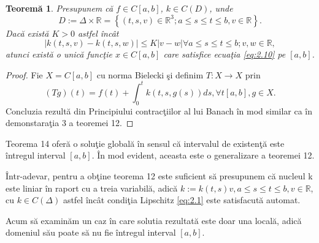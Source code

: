 \documentclass[a4paper,12pt,oneside]{report}
\newtheorem{theorem}{Teorem\u a}
\begin{document}
\begin{theorem}
Presupunem c\u{a} \(f\in C\left [ a,b \right ]\), \(k\in C\left ( D \right )\), unde
\begin{displaymath}
D:= \Delta \times \mathbb{R} = \left \{ \left ( t,s,v \right )\in \mathbb{R}^{3}; a\leq s\leq t\leq b, v\in \mathbb{R}\right \}.
\end{displaymath}
Dac\u{a} exist\u{a} \(K> 0\) astfel \^{i}nc\^{a}t
\begin{displaymath}
\left | k\left ( t,s,v \right )  - k\left ( t,s,w \right )\right |\leq K\left | v-w \right |\forall a\leq s\leq t\leq b; v,w\in \mathbb{R}, \label{eq:2.11} \tag{2.11}
\end{displaymath}
atunci exist\u{a} o unic\u{a} func\c{t}ie  \(x\in C\left [ a,b \right ]\) care satisfice ecua\c{t}ia \ref{eq:2.10} pe \(\left [ a,b \right ]\).
\end{theorem}

\begin{proof}

Fie \(X = C \left [ a,b \right ]\)  cu norma Bielecki \c{s}i definim \(T : X \rightarrow X\) prin
\begin{displaymath}
\left ( Tg \right )\left ( t \right ) = f\left ( t \right ) + \int_{0}^{t}k\left ( t,s,g\left ( s \right ) \right )ds, \forall t \left [ a,b \right ], g\in X.
\end{displaymath}
Concluzia rezult\u{a} din Principiului contrac\c{t}iilor al lui Banach \^{i}n mod similar ca \^{i}n demonstara\c{t}ia 3 a teoremei 12.
\end{proof}
\noindent Teorema 14 ofer\u{a} o solu\c{t}ie global\u{a} \^{i}n sensul c\u{a} intervalul de existen\c{t}\u{a} este \^{i}ntregul interval \(\left [ a,b \right ]\). \^{I}n mod evident, aceasta este o generalizare a teoremei 12.

\^{I}ntr-adevar, pentru a ob\c{t}ine teorema 12 este suficient s\u{a} presupunem c\u{a} nucleul k este liniar \^{i}n raport cu a treia variabil\u{a}, adic\u{a} \(k:= k\left ( t,s \right )v, a\leq s\leq t\leq b, v\in \mathbb{R}\), cu \(k \in C\left ( \Delta  \right )\) astfel \^{i}nc\^{a}t condi\c{t}ia Lipschitz \ref{eq:2.1} este satisfacut\u{a} automat.

\noindent Acum s\u{a} examin\u{a}m un caz \^{i}n care solutia rezultat\u{a} este doar una local\u{a}, adic\u{a} domeniul s\u{a}u poate s\u{a} nu fie \^{i}ntregul interval \(\left [ a,b \right ]\).
\end{document}
